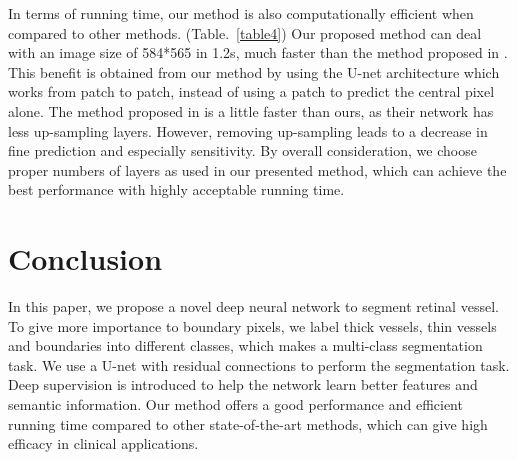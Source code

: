 \documentclass[runningheads,a4paper]{llncs}
\begin{document}
In terms of running time, our method is also computationally efficient when compared to other methods. (Table.~\ref{table4}) Our proposed method can deal with an image size of 584*565 in 1.2s, much faster than the method proposed in \cite{liskowski2016segmenting}. This benefit is obtained from our method by using the U-net architecture which works from patch to patch, instead of using a patch to predict the central pixel alone. The method proposed in \cite{mo2017multi} is a little faster than ours, as their network has less up-sampling layers. However, removing up-sampling leads to a decrease in fine prediction and especially sensitivity. By overall consideration, we choose proper numbers of layers as used in our presented method, which can achieve the best performance with highly acceptable running time.

\section{Conclusion}

In this paper, we propose a novel deep neural network to segment retinal vessel. To give more importance to boundary pixels, we label thick vessels, thin vessels and boundaries into different classes, which makes a multi-class segmentation task. We use a U-net with residual connections to perform the segmentation task. Deep supervision is introduced to help the network learn better features and semantic information. Our method offers a good performance and efficient running time compared to other state-of-the-art methods, which can give high efficacy in clinical applications.



\end{document}
